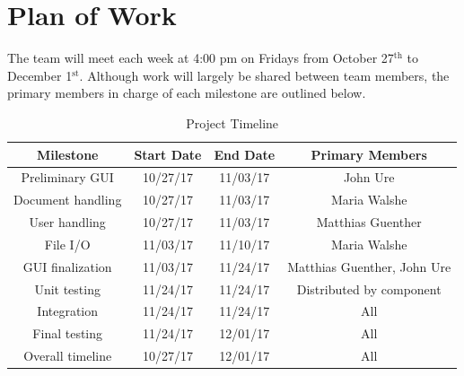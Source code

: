 \documentclass{article}
\begin{document}
\clearpage

\section*{Plan of Work}{
	
	The team will meet each week at 4:00 pm on Fridays from October 27$^\text{th}$ to December 1$^\text{st}$. Although work will largely be shared between team members, the primary members in charge of each milestone are outlined below.\\

	\begin{table}[!htb]
		\centering
		\begin{tabular}{| c | c | c | c |}
			\hline
			\textbf{Milestone}	&	\textbf{Start Date}	&	\textbf{End Date}	&	\textbf{Primary Members}	\\
			\hline
			Preliminary GUI		&	10/27/17			&	11/03/17			&	John Ure					\\
			Document handling	&	10/27/17			&	11/03/17			&	Maria Walshe				\\
			User handling		&	10/27/17			&	11/03/17			&	Matthias Guenther			\\
			\hline
			File I/O			&	11/03/17			&	11/10/17			&	Maria Walshe				\\
			GUI finalization	&	11/03/17			&	11/24/17			&	Matthias Guenther, John Ure	\\
			\hline
			Unit testing		&	11/24/17			&	11/24/17			&	Distributed	by component	\\
			Integration			&	11/24/17			&	11/24/17			&	All							\\
			Final testing		&	11/24/17			&	12/01/17			&	All							\\
			\hline
			Overall timeline	&	10/27/17			&	12/01/17			&	All							\\
			\hline
		\end{tabular}
		\label{tbl:tbl1}
		\caption{Project Timeline}
	\end{table}
}
\end{document}
